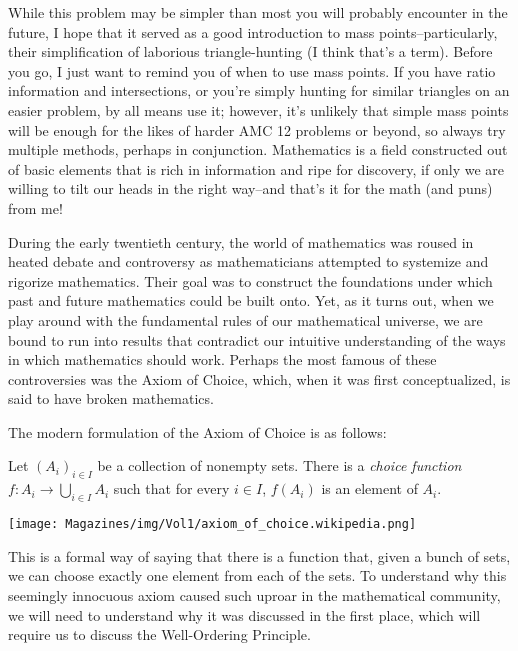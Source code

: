 \documentclass{article}
\begin{document}
\begin{multicols}{3}
While this problem may be simpler than most you will probably encounter in the future, I hope that it served as a good introduction to mass points–particularly, their simplification of laborious triangle-hunting (I think that’s a term). Before you go, I just want to remind you of when to use mass points. If you have ratio information and intersections, or you’re simply hunting for similar triangles on an easier problem, by all means use it; however, it’s unlikely that simple mass points will be enough for the likes of harder AMC 12 problems or beyond, so always try multiple methods, perhaps in conjunction. 
Mathematics is a field constructed out of basic elements that is rich in information and ripe for discovery, if only we are willing to tilt our heads in the right way--and that’s it for the math (and puns) from me!
\closearticle


During the early twentieth century, the world of mathematics was roused in heated debate and controversy as mathematicians attempted to systemize and rigorize mathematics. Their goal was to construct the foundations under which past and future mathematics could be built onto. Yet, as it turns out, when we play around with the fundamental rules of our mathematical universe, we are bound to run into results that contradict our intuitive understanding of the ways in which mathematics should work. Perhaps the most famous of these controversies was the Axiom of Choice, which, when it was first conceptualized, is said to have broken mathematics. 

The modern formulation of the Axiom of Choice is as follows:

Let $(A_i)_{i\in I}$ be a collection of nonempty sets. There is a \textit{choice function} $f:A_i\to \bigcup_{i\in I}A_i$ such that for every $i\in I$, $f(A_i)$ is an element of $A_i$.

\begin{center}
    \texttt{[image: Magazines/img/Vol1/axiom\_of\_choice.wikipedia.png]}
\end{center}

This is a formal way of saying that there is a function that, given a bunch of sets, we can choose exactly one element from each of the sets. To understand why this seemingly innocuous axiom caused such uproar in the mathematical community, we will need to understand why it was discussed in the first place, which will require us to discuss the Well-Ordering Principle. 


\end{multicols}
\end{document}
